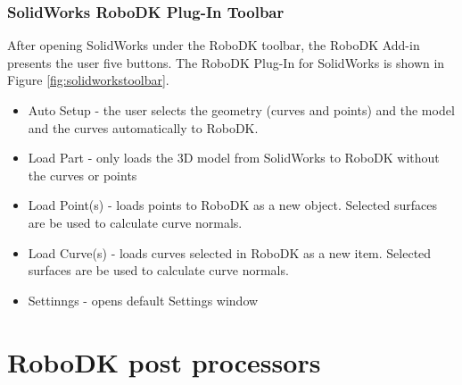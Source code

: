 \subsubsection*{SolidWorks RoboDK Plug-In Toolbar}

After opening SolidWorks under the RoboDK toolbar, the RoboDK Add-in presents the user five buttons. The RoboDK Plug-In for SolidWorks is shown in Figure  \ref{fig:solidworkstoolbar}. 

\begin{itemize}
    \item Auto Setup - the user selects the geometry (curves and points) and the model and the curves automatically to RoboDK.
    \item Load Part - only loads the 3D model from SolidWorks to RoboDK without the curves or points
    \item Load Point(s) - loads points to RoboDK as a new object. Selected surfaces are be used to calculate curve normals. 
    \item Load Curve(s) -  loads curves selected in RoboDK as a new item. Selected surfaces are be used to calculate curve normals. 
    \item Settinngs - opens default Settings window
\end{itemize}

\section{RoboDK post processors}